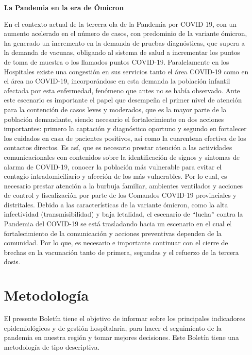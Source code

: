 \documentclass[12pt,a4paper,openany]{book}
\begin{document}
	\noindent \textbf{La Pandemia en la era de Ómicron}
	

En el contexto actual de la tercera ola de la Pandemia por COVID-19, con un aumento acelerado en el número de casos, con predominio de la variante ómicron, ha generado un incremento en la demanda de pruebas diagnósticas, que supera a la demanda de vacunas, obligando al sistema de salud a incrementar los puntos de toma de muestra o los llamados puntos COVID-19. Paralelamente en los Hospitales existe una congestión en sus servicios tanto el área COVID-19 como en el área no COVID-19, incorporándose en esta demanda la población infantil afectada por esta enfermedad, fenómeno que antes no se había observado.
Ante este escenario es importante el papel que desempeña el primer nivel de atención para la contención de casos leves y moderados, que es la mayor parte de la población demandante, siendo necesario el fortalecimiento en dos acciones importantes: primero la captación y diagnóstico oportuno y segundo en fortalecer los cuidados en casa de pacientes positivos, así como la cuarentena efectiva de los contactos directos. Es así, que es necesario prestar atención a las actividades comunicacionales con contenidos sobre la identificación de signos y síntomas de alarma de COVID-19, conocer la población más vulnerable para evitar el contagio intradomiciliario y afección de los más vulnerables. Por lo cual, es necesario prestar atención a la burbuja familiar, ambientes ventilados y acciones de control y fiscalización por parte de los Comandos COVID-19 provinciales y distritales.
Debido a las características de la variante ómicron, como la alta infectividad (transmisibilidad) y baja letalidad, el escenario de “lucha” contra la Pandemia del COVID-19 se está trasladando hacia un escenario en el cual el fortalecimiento de la comunicación y acciones preventivas dependen de la comunidad. Por lo que, es necesario e importante continuar con el cierre de brechas en la vacunación tanto de primera, segundas y el refuerzo de la tercera dosis.	
	
	
	\clearpage
	
	\section*{Metodología}	
	\noindent El presente Boletín tiene el objetivo de informar sobre los principales indicadores epidemiológicos y de gestión hospitalaria,  para hacer el seguimiento de la pandemia en nuestra región y tomar mejores decisiones. Este Boletín tiene una metodología de tipo descriptiva. 
	
\end{document}
